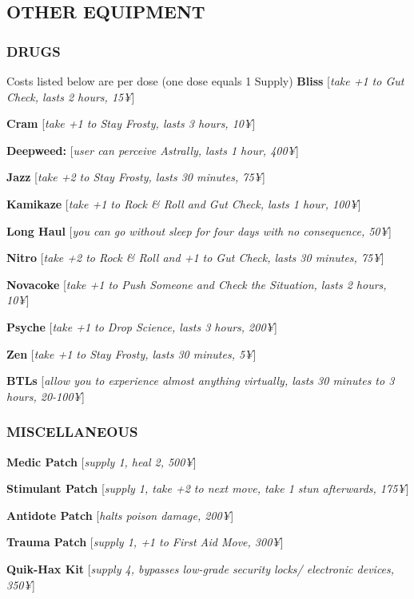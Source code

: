 \documentclass[oneside,10pt]{article}
\begin{document}
\begin{multicols}{2}
  \subsection{OTHER EQUIPMENT}
  \subsubsection{DRUGS}
  Costs listed below are per dose (one dose equals 1 Supply)
  \textbf{Bliss} [\textit{take +1 to Gut Check, lasts 2 hours, 15¥}]

  \textbf{Cram} [\textit{take +1 to Stay Frosty, lasts 3 hours, 10¥}]

  \textbf{Deepweed:} [\textit{user can perceive Astrally, lasts 1
    hour, 400¥}]

  \textbf{Jazz} [\textit{take +2 to Stay Frosty, lasts 30 minutes,
    75¥}]

  \textbf{Kamikaze} [\textit{take +1 to Rock \& Roll and Gut Check,
    lasts 1 hour, 100¥}]

  \textbf{Long Haul} [\textit{you can go without sleep for four days
    with no consequence, 50¥}]

  \textbf{Nitro} [\textit{take +2 to Rock \& Roll and +1 to Gut Check,
    lasts 30 minutes, 75¥}]

  \textbf{Novacoke} [\textit{take +1 to Push Someone and Check the
    Situation, lasts 2 hours, 10¥}]

  \textbf{Psyche} [\textit{take +1 to Drop Science, lasts 3 hours,
    200¥}]

  \textbf{Zen} [\textit{take +1 to Stay Frosty, lasts 30 minutes, 5¥}]

  \textbf{BTLs} [\textit{allow you to experience almost anything
    virtually, lasts 30 minutes to 3 hours, 20-100¥}]


  \subsubsection{MISCELLANEOUS}
  \textbf{Medic Patch} [\textit{supply 1, heal 2, 500¥}]

  \textbf{Stimulant Patch} [\textit{supply 1, take +2 to next move,
    take 1 stun afterwards, 175¥}]

  \textbf{Antidote Patch} [\textit{halts poison damage, 200¥}]

  \textbf{Trauma Patch} [\textit{supply 1, +1 to First Aid Move,
    300¥}]

  \textbf{Quik-Hax Kit} [\textit{supply 4, bypasses low-grade security
    locks/ electronic devices, 350¥}]


\end{multicols}
\end{document}

